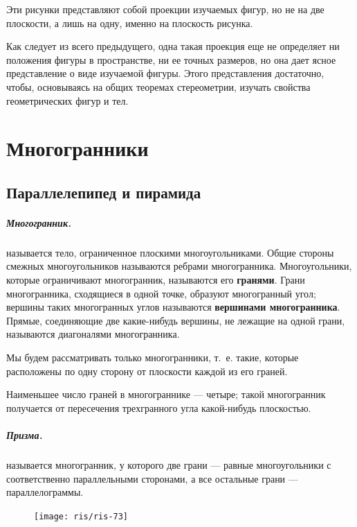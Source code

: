 \documentclass[twoside]{book}
\begin{document}
Эти рисунки представляют собой проекции изучаемых фигур, но не на две плоскости, а лишь на одну, именно на плоскость рисунка.

Как следует из всего предыдущего, одна такая проекция еще не определяет ни положения фигуры в пространстве, ни ее точных размеров, но она дает ясное представление о виде изучаемой фигуры.
Этого представления достаточно, чтобы, основываясь на общих теоремах стереометрии, изучать свойства геометрических фигур и тел.

\chapter{Многогранники}


\section{Параллелепипед и пирамида}

\paragraph{Многогранник.}\label{1938/s67}
 называется тело, ограниченное плоскими многоугольниками.
Общие стороны смежных многоугольников называются ребрами многогранника.
Многоугольники, которые ограничивают многогранник, называются его \textbf{гранями}.
Грани многогранника, сходящиеся в одной точке, образуют многогранный угол;
вершины таких многогранных углов называются \textbf{вершинами многогранника}.
Прямые, соединяющие две какие-нибудь вершины, не лежащие на одной грани, называются диагоналями многогранника.

Мы будем рассматривать только  многогранники, т.~е. такие, которые расположены по одну сторону от плоскости каждой из его граней.

Наименьшее число граней в многограннике --- четыре;
такой многогранник получается от пересечения трехгранного угла какой-нибудь плоскостью. %

\paragraph{Призма.}\label{1938/s68}
 называется многогранник, у которого две грани --- равные многоугольники с соответственно параллельными сторонами, а все остальные грани --- параллелограммы.

\begin{figure}[h!]
\centering
\texttt{[image: ris/ris-73]}
\caption{}
\end{figure}
\end{document}
